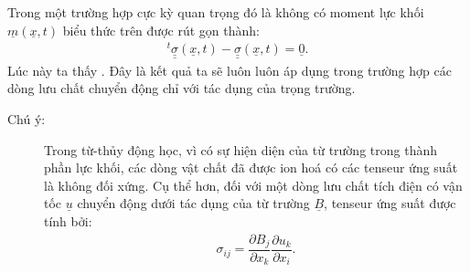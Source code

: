 \documentclass[../../../main.tex]{subfiles}
\begin{document}
	Trong một trường hợp cực kỳ quan trọng đó là không có moment lực khối $\underline{m}\left(\underline{x},t\right)$ biểu thức trên được rút gọn thành:
		\begin{align}
			\boxed{{}^t\underline{\underline{\sigma}}\left(\underline{x},t\right)-\underline{\underline{\sigma}}\left(\underline{x},t\right)=\underline{0}}.
		\end{align}
	Lúc này ta thấy . Đây là kết quả ta sẽ luôn luôn áp dụng trong trường hợp các dòng lưu chất chuyển động chỉ với tác dụng của trọng trường.
	\begin{description}
		\item[Chú ý:] Trong từ-thủy động học, vì có sự hiện diện của từ trường trong thành phần lực khối, các dòng vật chất đã được ion hoá có các tenseur ứng suất là không đối xứng. Cụ thể hơn, đối với một dòng lưu chất tích điện có vận tốc $\underline{u}$ chuyển động dưới tác dụng của từ trường $\underline{B}$, tenseur ứng suất được tính bởi:
			\begin{align}
				\sigma_{ij}=\dfrac{\partial B_j}{\partial x_k}\dfrac{\partial u_k}{\partial x_i}.
			\end{align}
			
	\end{description}
\end{document}
